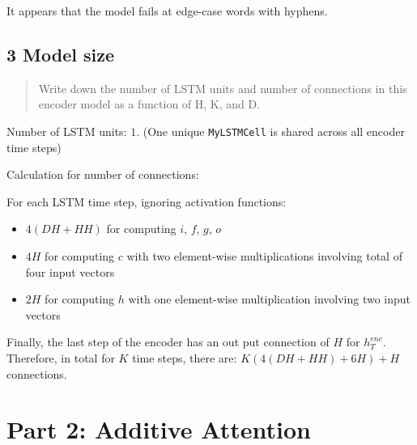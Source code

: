 \documentclass{article}
\begin{document}
It appears that the model fails at edge-case words with hyphens. %


\subsection*{3 Model size}


\begin{quote}
Write down the number of LSTM units and number of connections in this encoder model as a function of H, K, and D.
\end{quote}

Number of LSTM units: $1$. (One unique \texttt{MyLSTMCell} is shared across all encoder time steps)

Calculation for number of connections: 

For each LSTM time step, ignoring activation functions:

\begin{itemize}
\item 
$4(DH+HH)$ for computing $i$, $f$, $g$, $o$
\item
$4H$ for computing $c$ with two element-wise multiplications involving total of four input vectors
\item
$2H$ for computing $h$ with one element-wise multiplication involving two input vectors
\end{itemize}

Finally, the last step of the encoder has an out put connection of $H$ for $h^{enc}_T$. Therefore, in total for $K$ time steps, there are: $K(4(DH+HH)+6H)+H$ connections.




\pagebreak
\section*{Part 2: Additive Attention}
\end{document}
